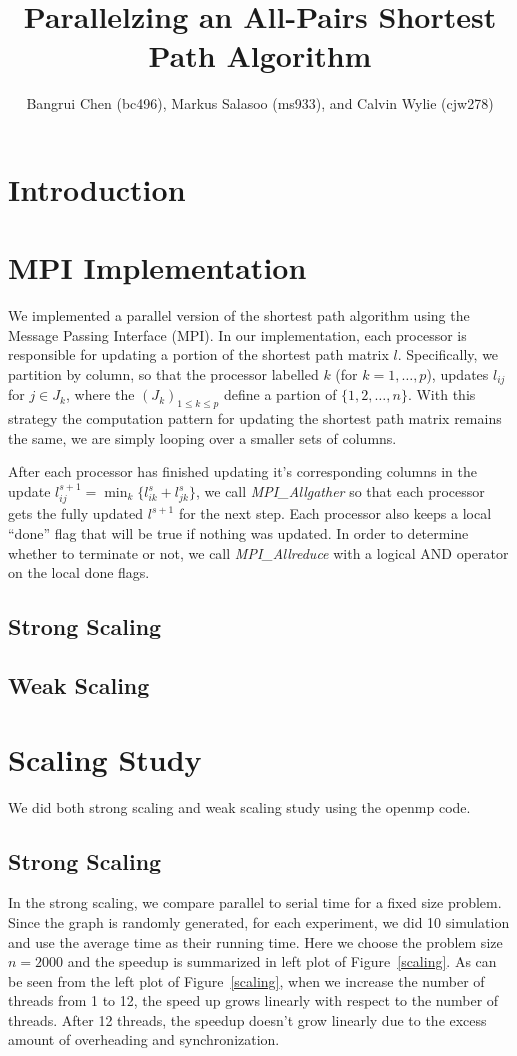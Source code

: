 \documentclass[11pt]{article}
\title{Parallelzing an All-Pairs Shortest Path Algorithm}
\author{Bangrui Chen (bc496), Markus Salasoo (ms933), and Calvin Wylie (cjw278)}
\begin{document}
\maketitle

\section*{Introduction}

\section*{MPI Implementation}

We implemented a parallel version of the shortest path algorithm using the
Message Passing Interface (MPI).
In our implementation, each processor is responsible for updating a portion of 
the shortest path matrix $l$.  Specifically, we partition by column, so that 
the processor labelled $k$ (for $k = 1, \ldots, p$), updates $l_{ij}$ for 
$j \in J_k$, where the $(J_k)_{1 \leq k \leq p}$ define a partion of 
$\{1, 2, \ldots, n\}$.
With this strategy the computation pattern for updating the shortest path matrix
remains the same, we are simply looping over a smaller sets of columns.

After each processor has finished updating it's corresponding columns in
the update $l_{ij}^{s+1} = \min_k \{ l^s_{ik} + l^s_{jk} \}$, we call
\emph{MPI\_Allgather} so that each processor gets the fully updated $l^{s+1}$
for the next step.  Each processor also keeps a local ``done'' flag that will
be true if nothing was updated.  In order to determine whether to terminate
or not, we call \emph{MPI\_Allreduce} with a logical AND operator on the local
done flags.

\subsection*{Strong Scaling}

\subsection*{Weak Scaling}

\section*{Scaling Study}
We did both strong scaling and weak scaling study using the openmp code.
\subsection{Strong Scaling}
In the strong scaling, we compare parallel to serial time for a fixed size problem. Since the graph is randomly generated, for each experiment, we did 10 simulation and use the average time as their running time. Here we choose the problem size $n=2000$ and the speedup is summarized in left plot of Figure~\ref{scaling}. As can be seen from the left plot of Figure~\ref{scaling}, when we increase the number of threads from 1 to 12, the speed up grows linearly with respect to the number of threads. After 12 threads, the speedup doesn't grow linearly due to the excess amount of overheading and synchronization.
\end{document}
